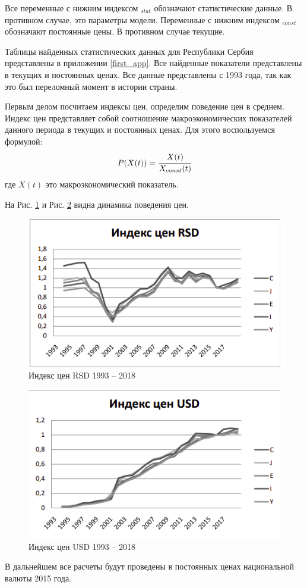 Все переменные с нижним индексом $_{stat}$ обозначают статистические данные.
В противном случае, это параметры модели.
Переменные с нижним индексом $_{const}$ обозначают постоянные цены.
В противном случае текущие.

Таблицы найденных статистических данных для Республики Сербия  представлены в приложении \ref{first_app}.
Все найденные показатели представлены в текущих и постоянных ценах.
Все данные представлены с 1993 года, так как это был переломный момент в истории страны.

Первым делом посчитаем индексы цен, определим поведение цен в среднем.
Индекс цен представляет собой соотношение макроэкономических показателей данного периода в текущих и постоянных ценах.
Для этого воспользуемся формулой:
\begin{equation}
	P(X(t)) = \cfrac{X(t)}{X_{const}(t)}
\end{equation}
где $X(t)$ это макроэкономический показатель.

На Рис. \ref{fig:index_rsd} и Рис. \ref{fig:index_usd} видна динамика поведения цен.
\begin{figure}
	\centering
	\includegraphics[scale=0.8]{images/index_rsd.png}
	\caption{Индекс цен RSD 1993 -- 2018}
	\label{fig:index_rsd}
\end{figure}
\begin{figure}
	\centering
	\includegraphics[scale=0.8]{images/index_usd.png}
	\caption{Индекс цен USD 1993 -- 2018}
	\label{fig:index_usd}
\end{figure}

В дальнейшем все расчеты будут проведены в постоянных ценах национальной валюты 2015 года.
